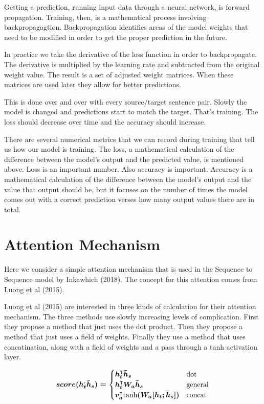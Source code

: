 Getting a prediction, running input data through a neural network, is forward propagation.
Training, then, is a mathematical process involving backpropagagtion. Backpropagation identifies areas of the model weights that need to be modified in order to get the proper prediction in the future.

In practice we take the derivative of the loss function in order to backpropagate. The derivative is multiplied by the learning rate and subtracted from the original weight value. The result is a set of adjusted weight matrices. When these matrices are used later they allow for better predictions. 

This is done over and over with every source/target sentence pair. Slowly the model is changed and predictions start to match the target. That's training. The loss should decrease over time and the accuracy should increase.

There are several numerical metrics that we can record during training that tell us how our model is training. The loss, a mathematical calculation of the difference between the model's output and the predicted value, is mentioned above. Loss is an important number. Also accuracy is important. Accuracy is a mathematical calculation of the difference between the model's output and the value that output should be, but it focuses on the number of times the model comes out with a correct prediction verses how many output values there are in total.

\section{Attention Mechanism}

Here we consider a simple attention mechanism that is used in the Sequence to Sequence model by Inkawhich (2018)\cite{2018Inkawhich}. The concept for this attention comes from Luong et al (2015)\cite{DBLP:journals/corr/LuongPM15}.

Luong et al (2015)\cite{DBLP:journals/corr/LuongPM15} are interested in three kinds of calculation for their attention mechanism. The three methods use slowly increasing levels of complication. First they propose a method that just uses the dot product. Then they propose a method that just uses a field of weights. Finally they use a method that uses concatination, along with a field of weights and a pass through a tanh activation layer.

$$
\boldmath
score(h_t^ \text{,} \bar{h}_s) =
\begin{cases}
    h_t^\intercal \bar{h}_s & \text{dot} \\
	h_t^\intercal W_a \bar{h}_s & \text{general} \\
	v_a^\intercal \text{tanh}(W_a [h_t ; \bar{h}_s] ) & \text{concat}
\end{cases}
\unboldmath
$$

